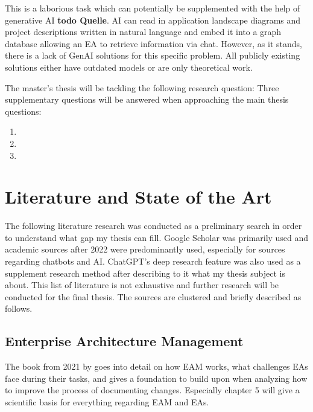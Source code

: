 \documentclass[english]{lni}
\begin{document}
This is a laborious task which can potentially be supplemented with the help of generative AI \textbf{todo Quelle}. AI can read in application landscape diagrams and project descriptions written in natural language and embed it into a graph database allowing an EA to retrieve information via chat. However, as it stands, there is a lack of GenAI solutions for this specific problem. All publicly existing solutions either have outdated models or are only theoretical work.

The master's thesis will be tackling the following research question:  Three supplementary questions will be answered when approaching the main thesis questions:
\begin{enumerate}
    \item {}
    \item {}
    \item {}
\end{enumerate}


\section{Literature and State of the Art}
The following literature research was conducted as a preliminary search in order to understand what gap my thesis can fill. Google Scholar was primarily used and academic sources after 2022 were predominantly used, especially for sources regarding chatbots and AI. ChatGPT's deep research feature was also used as a supplement research method after describing to it what my thesis subject is about. This list of literature is not exhaustive and further research will be conducted for the final thesis. The sources are clustered and briefly described as follows.

\subsection{Enterprise Architecture Management}
The book from 2021 by \cite{jung2021masterclass} goes into detail on how EAM works, what challenges EAs face during their tasks, and gives a foundation to build upon when analyzing how to improve the process of documenting changes. Especially chapter 5 will give a scientific basis for everything regarding EAM and EAs.
\end{document}
